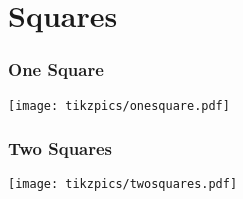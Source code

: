\documentclass[../main.tex]{subfiles}
\begin{document}
\chapter{Squares}

\subsection{One Square}

\texttt{[image: tikzpics/onesquare.pdf]}

\subsection{Two Squares}

\texttt{[image: tikzpics/twosquares.pdf]}
\end{document}
